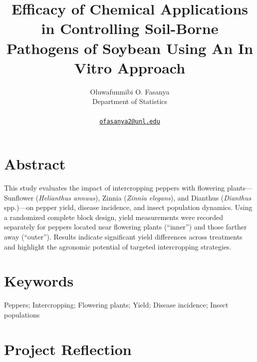 \documentclass[
  10pt,
  letterpaper,
  twocolumn]{article}
\title{Efficacy of Chemical Applications in Controlling Soil-Borne
Pathogens of Soybean Using An In Vitro Approach}
\author{
Oluwafunmibi O. Fasanya\\
Department of Statistics\\\\
{\tt \href{mailto:ofasanya2@unl.edu}{ofasanya2@unl.edu}}\\
}
\date{}
\begin{document}
\maketitle
\ifdefined\Shaded\renewenvironment{Shaded}{\begin{tcolorbox}[breakable, interior hidden, sharp corners, enhanced, borderline west={3pt}{0pt}{shadecolor}, boxrule=0pt, frame hidden]}{\end{tcolorbox}}\fi

\hypertarget{abstract}{%
\section{Abstract}\label{abstract}}

This study evaluates the impact of intercropping peppers with flowering
plants---Sunflower (\emph{Helianthus annuus}), Zinnia (\emph{Zinnia
elegans}), and Dianthus (\emph{Dianthus} spp.)---on pepper yield,
disease incidence, and insect population dynamics. Using a randomized
complete block design, yield measurements were recorded separately for
peppers located near flowering plants (``inner'') and those farther away
(``outer''). Results indicate significant yield differences across
treatments and highlight the agronomic potential of targeted
intercropping strategies.

\hypertarget{keywords}{%
\section{Keywords}\label{keywords}}

Peppers; Intercropping; Flowering plants; Yield; Disease incidence;
Insect populations

\hypertarget{project-reflection}{%
\section{Project Reflection}\label{project-reflection}}
\end{document}
